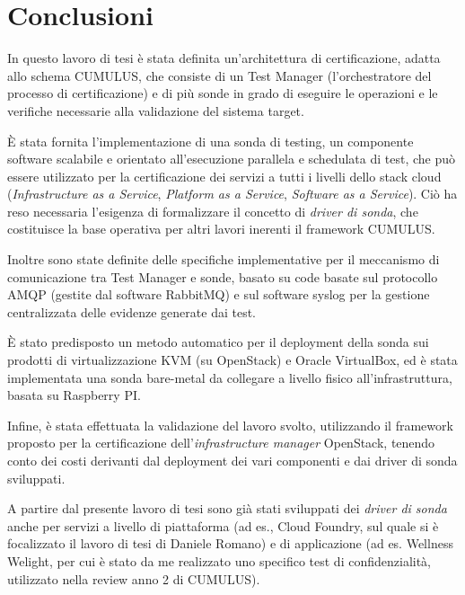 \documentclass[../main.tex]{subfiles}
\begin{document}
\chapter{Conclusioni}

In questo lavoro di tesi è stata definita un'architettura di certificazione, adatta allo schema CUMULUS, che consiste di un Test Manager (l'orchestratore del processo di certificazione) e di più sonde in grado di eseguire le operazioni e le verifiche necessarie alla validazione del sistema target.

\`E stata fornita l'implementazione di una sonda di testing, un componente software scalabile e orientato all'esecuzione parallela e schedulata di test, che può essere utilizzato per la certificazione dei servizi a tutti i livelli dello stack cloud (\textit{Infrastructure as a Service}, \textit{Platform as a Service}, \textit{Software as a Service}).
Ciò ha reso necessaria l'esigenza di formalizzare il concetto di \textit{driver di sonda}, che costituisce la base operativa per altri lavori inerenti il framework CUMULUS.

Inoltre sono state definite delle specifiche implementative per il meccanismo di comunicazione tra Test Manager e sonde, basato su code basate sul protocollo AMQP (gestite dal software RabbitMQ) e sul software syslog per la gestione centralizzata delle evidenze generate dai test.

\`E stato predisposto un metodo automatico per il deployment della sonda sui prodotti di virtualizzazione KVM (su OpenStack) e Oracle VirtualBox, ed è stata implementata una sonda bare-metal da collegare a livello fisico all'infrastruttura, basata su Raspberry PI.

Infine, è stata effettuata la validazione del lavoro svolto, utilizzando il framework proposto per la certificazione dell'\textit{infrastructure manager} OpenStack, tenendo conto dei costi derivanti dal deployment dei vari componenti e dai driver di sonda sviluppati.

A partire dal presente lavoro di tesi sono già stati sviluppati dei \textit{driver di sonda} anche per servizi a livello di piattaforma (ad es., Cloud Foundry, sul quale si è focalizzato il lavoro di tesi di Daniele Romano) e di applicazione (ad es. Wellness Welight, per cui è stato da me realizzato uno specifico test di confidenzialità, utilizzato nella review anno 2 di CUMULUS).
\end{document}
